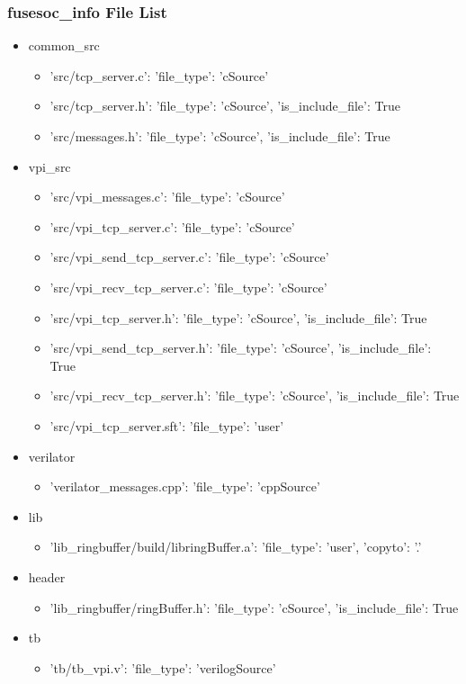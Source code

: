 \subsubsection{fusesoc\_info File List}
\begin{itemize}
\item common\_src
	\begin{itemize}
	\item {'src/tcp\_server.c': {'file\_type': 'cSource'}}
	\item {'src/tcp\_server.h': {'file\_type': 'cSource', 'is\_include\_file': True}}
	\item {'src/messages.h': {'file\_type': 'cSource', 'is\_include\_file': True}}
	\end{itemize}
\item vpi\_src
	\begin{itemize}
	\item {'src/vpi\_messages.c': {'file\_type': 'cSource'}}
	\item {'src/vpi\_tcp\_server.c': {'file\_type': 'cSource'}}
	\item {'src/vpi\_send\_tcp\_server.c': {'file\_type': 'cSource'}}
	\item {'src/vpi\_recv\_tcp\_server.c': {'file\_type': 'cSource'}}
	\item {'src/vpi\_tcp\_server.h': {'file\_type': 'cSource', 'is\_include\_file': True}}
	\item {'src/vpi\_send\_tcp\_server.h': {'file\_type': 'cSource', 'is\_include\_file': True}}
	\item {'src/vpi\_recv\_tcp\_server.h': {'file\_type': 'cSource', 'is\_include\_file': True}}
	\item {'src/vpi\_tcp\_server.sft': {'file\_type': 'user'}}
	\end{itemize}
\item verilator
	\begin{itemize}
	\item {'verilator\_messages.cpp': {'file\_type': 'cppSource'}}
	\end{itemize}
\item lib
	\begin{itemize}
	\item {'lib\_ringbuffer/build/libringBuffer.a': {'file\_type': 'user', 'copyto': '.'}}
	\end{itemize}
\item header
	\begin{itemize}
	\item {'lib\_ringbuffer/ringBuffer.h': {'file\_type': 'cSource', 'is\_include\_file': True}}
	\end{itemize}
\item tb
	\begin{itemize}
	\item {'tb/tb\_vpi.v': {'file\_type': 'verilogSource'}}
	\end{itemize}
\end{itemize}
